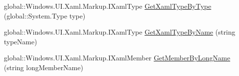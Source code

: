 \begin{DoxyCompactItemize}
\item 
global\+::\+Windows.\+U\+I.\+Xaml.\+Markup.\+I\+Xaml\+Type \hyperlink{class_e_l_i_client_1_1_e_l_i_client___xaml_type_info_1_1_xaml_type_info_provider_aadb1638e0d9ca3d88b8241fcbfdb7fa1}{Get\+Xaml\+Type\+By\+Type} (global\+::\+System.\+Type type)
\item 
global\+::\+Windows.\+U\+I.\+Xaml.\+Markup.\+I\+Xaml\+Type \hyperlink{class_e_l_i_client_1_1_e_l_i_client___xaml_type_info_1_1_xaml_type_info_provider_a9a7ee44624a8f05d29bee33253a2c26c}{Get\+Xaml\+Type\+By\+Name} (string type\+Name)
\item 
global\+::\+Windows.\+U\+I.\+Xaml.\+Markup.\+I\+Xaml\+Member \hyperlink{class_e_l_i_client_1_1_e_l_i_client___xaml_type_info_1_1_xaml_type_info_provider_a2cc8367d32444aa8fced5ac7a199a576}{Get\+Member\+By\+Long\+Name} (string long\+Member\+Name)
\end{DoxyCompactItemize}
